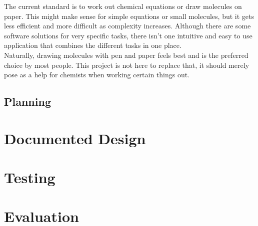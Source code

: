 \documentclass[a4paper,12pt]{article}
\begin{document}
The current standard is to work out chemical equations or draw molecules on paper. This might make sense for simple equations or small molecules, but it gets less efficient and more difficult as complexity increases. Although there are some software solutions for very specific tasks, there isn't one intuitive and easy to use application that combines the different tasks in one place.\\
\linebreak
Naturally, drawing molecules with pen and paper feels best and is the preferred choice by most people. This project is not here to replace that, it should merely pose as a help for chemists when working certain things out.

\subsection{Planning}

\section{Documented Design}

\section{Testing}

\section{Evaluation}
\newpage
\end{document}
